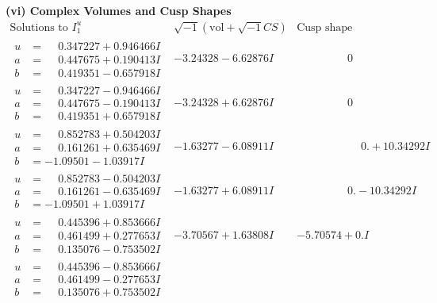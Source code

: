 \documentclass[1p]{elsarticle_modified}
\theoremstyle{definition}
\newcommand{\I}{\sqrt{-1}}
\begin{document}
\newpage\flushleft \textbf{(vi) Complex Volumes and Cusp Shapes}
$$\begin{array}{c|c|c}  
\text{Solutions to }I^u_{1}& \I (\text{vol} + \sqrt{-1}CS) & \text{Cusp shape}\\
 \hline 
\begin{aligned}
u &= \phantom{-}0.347227 + 0.946466 I \\
a &= \phantom{-}0.447675 + 0.190413 I \\
b &= \phantom{-}0.419351 - 0.657918 I\end{aligned}
 & -3.24328 - 6.62876 I & \phantom{-0.000000 } 0 \\ \hline\begin{aligned}
u &= \phantom{-}0.347227 - 0.946466 I \\
a &= \phantom{-}0.447675 - 0.190413 I \\
b &= \phantom{-}0.419351 + 0.657918 I\end{aligned}
 & -3.24328 + 6.62876 I & \phantom{-0.000000 } 0 \\ \hline\begin{aligned}
u &= \phantom{-}0.852783 + 0.504203 I \\
a &= \phantom{-}0.161261 + 0.635469 I \\
b &= -1.09501 - 1.03917 I\end{aligned}
 & -1.63277 - 6.08911 I & \phantom{-0.000000 -}0. + 10.34292 I \\ \hline\begin{aligned}
u &= \phantom{-}0.852783 - 0.504203 I \\
a &= \phantom{-}0.161261 - 0.635469 I \\
b &= -1.09501 + 1.03917 I\end{aligned}
 & -1.63277 + 6.08911 I & \phantom{-0.000000 } 0. - 10.34292 I \\ \hline\begin{aligned}
u &= \phantom{-}0.445396 + 0.853666 I \\
a &= \phantom{-}0.461499 + 0.277653 I \\
b &= \phantom{-}0.135076 - 0.753502 I\end{aligned}
 & -3.70567 + 1.63808 I & -5.70574 + 0. I\phantom{ +0.000000I} \\ \hline\begin{aligned}
u &= \phantom{-}0.445396 - 0.853666 I \\
a &= \phantom{-}0.461499 - 0.277653 I \\
b &= \phantom{-}0.135076 + 0.753502 I\end{aligned}

\end{array}$$
\end{document}
